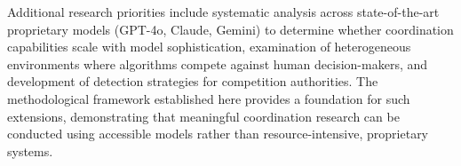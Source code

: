 Additional research priorities include systematic analysis across state-of-the-art proprietary models (GPT-4o, Claude, Gemini) to determine whether coordination capabilities scale with model sophistication, examination of heterogeneous environments where algorithms compete against human decision-makers, and development of detection strategies for competition authorities. The methodological framework established here provides a foundation for such extensions, demonstrating that meaningful coordination research can be conducted using accessible models rather than resource-intensive, proprietary systems.

